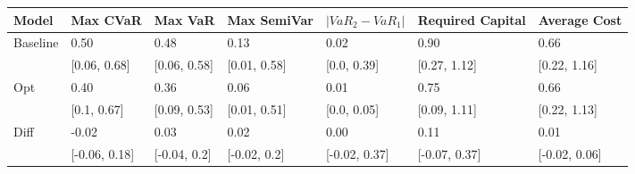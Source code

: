 \begin{tabular}{lllllll}
\toprule
   Model &      Max CVaR &      Max VaR &  Max SemiVar & $|VaR_2 - VaR_1|$ & Required Capital &  Average Cost \\
\midrule
Baseline &          0.50 &         0.48 &         0.13 &              0.02 &             0.90 &          0.66 \\
         &  [0.06, 0.68] & [0.06, 0.58] & [0.01, 0.58] &       [0.0, 0.39] &     [0.27, 1.12] &  [0.22, 1.16] \\
     Opt &          0.40 &         0.36 &         0.06 &              0.01 &             0.75 &          0.66 \\
         &   [0.1, 0.67] & [0.09, 0.53] & [0.01, 0.51] &       [0.0, 0.05] &     [0.09, 1.11] &  [0.22, 1.13] \\
    Diff &         -0.02 &         0.03 &         0.02 &              0.00 &             0.11 &          0.01 \\
         & [-0.06, 0.18] & [-0.04, 0.2] & [-0.02, 0.2] &     [-0.02, 0.37] &    [-0.07, 0.37] & [-0.02, 0.06] \\
\bottomrule
\end{tabular}
